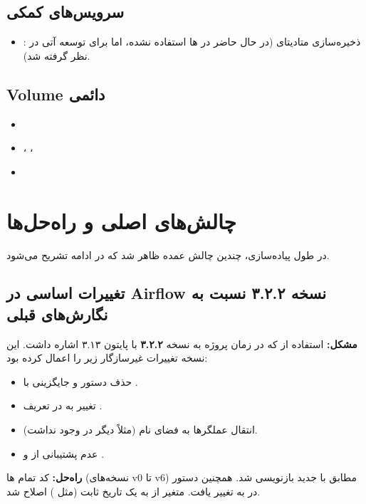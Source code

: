 \documentclass[12pt,a4paper]{article}
\begin{document}
\subsection{سرویس‌های کمکی}
\begin{itemize}
\item {}: ذخیره‌سازی متادیتای  (در حال حاضر در ها استفاده نشده، اما برای توسعه آتی در نظر گرفته شد).
\end{itemize}

\subsection{Volume دائمی}
\begin{itemize}
\item {}
\item {}، ، 
\item {}
\end{itemize}

\section{چالش‌های اصلی و راه‌حل‌ها}
در طول پیاده‌سازی، چندین چالش عمده ظاهر شد که در ادامه تشریح می‌شود.

\subsection{تغییرات اساسی در Airflow نسخه ۳.۲.۲ نسبت به نگارش‌های قبلی}
\textbf{مشکل:} استفاده از  که در زمان پروژه به نسخه  \textbf{۳.۲.۲} با پایتون ۳.۱۳ اشاره داشت. این نسخه تغییرات غیرسازگار زیر را اعمال کرده بود:
\begin{itemize}
\item حذف دستور  و جایگزینی با .
\item تغییر  به  در تعریف .
\item انتقال عملگرها به فضای نام  (مثلاً  دیگر در  وجود نداشت).
\item عدم پشتیبانی از  و .
\end{itemize}
\textbf{راه‌حل:} کد تمام ها (نسخه‌های v0 تا v6) مطابق با  جدید بازنویسی شد. همچنین دستور  در  به  تغییر یافت. متغیر  از  به یک تاریخ ثابت (مثل ) اصلاح شد.
\end{document}
